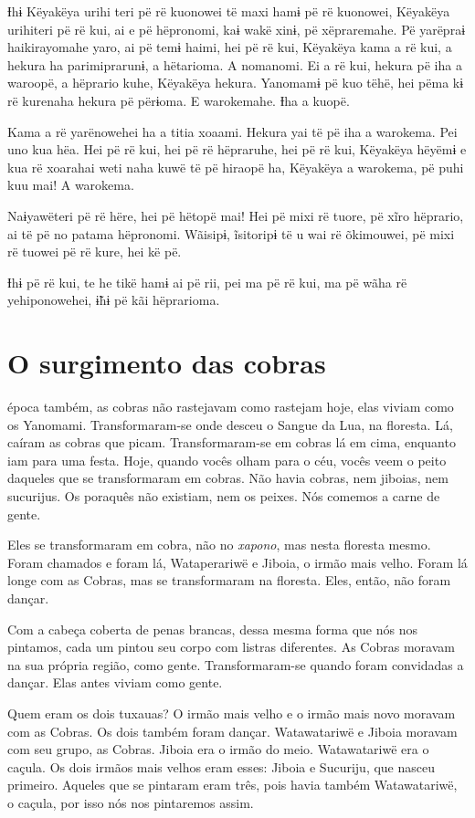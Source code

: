 Ɨhɨ Këyakëya urihi teri pë rë kuonowei të maxi hamɨ pë rë kuonowei,
Këyakëya urihiteri pë rë kui, ai e pë hëpronomi, kaɨ wakë xinɨ, pë
xëpraremahe. Pë yarëpraɨ haikirayomahe yaro, ai pë temɨ haimi, hei pë rë
kui, Këyakëya kama a rë kui, a hekura ha parimiprarunɨ, a hëtarioma. A nomanomi. Ei a rë kui, hekura pë iha a waroopë, a hëprario kuhe,
Këyakëya hekura. Yanomamɨ pë kuo tëhë, hei pëma kɨ rë kurenaha hekura pë
përɨoma. E warokemahe. Ɨha a kuopë. 

Kama a rë yarënowehei ha a titia xoaami. Hekura yai të pë iha a
warokema. Pei uno kua hëa. Hei pë rë kui, hei pë rë hëpraruhe, hei pë rë
kui, Këyakëya hëyëmɨ e kua rë xoarahai weti naha kuwë të pë hiraopë ha,
Këyakëya a warokema, pë puhi kuu mai! A warokema. 

Naɨyawëteri pë rë hëre, hei pë hëtopë mai! Hei pë mixi rë tuore, pë xĩro
hëprario, ai të pë no patama hëpronomi. Wãisipɨ, ĩsitoripɨ të u wai rë
õkimouwei, pë mixi rë tuowei pë rë kure, hei kë pë. 

Ɨhɨ pë rë kui, te he tikë hamɨ ai pë rii, pei ma pë rë kui, ma pë wãha
rë yehiponowehei, ɨ̃hɨ pë kãi hëprarioma.

\chapter{O surgimento das cobras}
 
 época também, as cobras não rastejavam como rastejam hoje, elas
viviam como os Yanomami. Transformaram-se onde desceu o Sangue da Lua,
na floresta. Lá, caíram as cobras que picam. Transformaram-se em cobras
lá em cima, enquanto iam para uma festa. Hoje, quando vocês olham para o
céu, vocês veem o peito daqueles que se transformaram em cobras. Não
havia cobras, nem jiboias, nem sucurijus. Os poraquês não existiam, nem
os peixes. Nós comemos a carne de gente.

Eles se transformaram em cobra, não no \textit{xapono}, mas nesta floresta mesmo.
Foram chamados e foram lá, Wataperariwë e Jiboia, o irmão mais velho.
Foram lá longe com as Cobras, mas se transformaram na floresta. Eles,
então, não foram dançar. 

Com a cabeça coberta de penas brancas, dessa mesma forma que nós nos
pintamos, cada um pintou seu corpo com listras diferentes. As Cobras
moravam na sua própria região, como gente. Transformaram-se quando
foram convidadas a dançar. Elas antes viviam como gente. 

Quem eram os dois tuxauas? O irmão mais velho e o irmão mais novo
moravam com as Cobras. Os dois também foram dançar. Watawatariwë e
Jiboia moravam com seu grupo, as Cobras. Jiboia era o irmão do meio.
Watawatariwë era o caçula. Os dois irmãos mais velhos eram esses: Jiboia
e Sucuriju, que nasceu primeiro. Aqueles que se pintaram eram três, pois
havia também Watawatariwë, o caçula, por isso nós nos pintaremos assim. 

